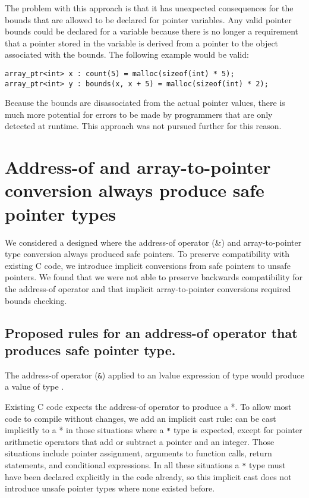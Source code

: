 The problem with this approach is that it has unexpected consequences
for the bounds that are allowed to be declared for pointer variables.
Any valid pointer bounds could be declared for a variable because there
is no longer a requirement that a pointer stored in the variable is
derived from a pointer to the object associated with the bounds. The
following example would be valid:

\begin{verbatim}
array_ptr<int> x : count(5) = malloc(sizeof(int) * 5);
array_ptr<int> y : bounds(x, x + 5) = malloc(sizeof(int) * 2);
\end{verbatim}

Because the bounds are disassociated from the actual pointer values,
there is much more potential for errors to be made by programmers that
are only detected at runtime. This approach was not pursued further for
this reason.

\section{Address-of and array-to-pointer conversion always produce safe pointer types}\label{address-of-and-array-to-pointer-conversion-always-produce-safe-pointer-types}

We considered a designed where the address-of operator (\&) and
array-to-pointer type conversion always produced safe pointers. To
preserve compatibility with existing C code, we introduce implicit
conversions from safe pointers to unsafe pointers. We found that we were
not able to preserve backwards compatibility for the address-of operator
and that implicit array-to-pointer conversions required bounds checking.

\subsection{Proposed rules for an address-of operator that produces safe pointer type.}\label{proposed-rules-for-an-address-of-operator-that-produces-safe-pointer-type.}

The address-of operator (\texttt{\&}) applied to an lvalue expression of
type  would produce a value of type
\ptrT.

Existing C code expects the address-of operator to produce a  *.
To allow most code to compile without changes, we add an implicit cast
rule: \ptrT can be cast
implicitly to a  * in those situations where a 
\texttt{*} type is expected, except for pointer arithmetic operators
that add or subtract a pointer and an integer. Those situations include
pointer assignment, arguments to function calls, return statements, and
conditional expressions. In all these situations a  \texttt{*}
type must have been declared explicitly in the code already, so this
implicit cast does not introduce unsafe pointer types where none existed
before.

